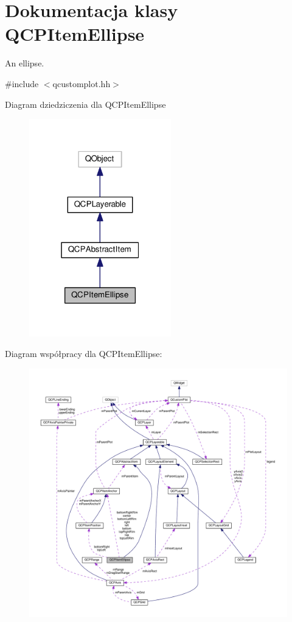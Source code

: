 \hypertarget{class_q_c_p_item_ellipse}{}\section{Dokumentacja klasy Q\+C\+P\+Item\+Ellipse}
\label{class_q_c_p_item_ellipse}


An ellipse.  




{\ttfamily \#include $<$qcustomplot.\+hh$>$}



Diagram dziedziczenia dla Q\+C\+P\+Item\+Ellipse\nopagebreak
\begin{figure}[H]
\begin{center}
\leavevmode
\includegraphics[width=175pt]{class_q_c_p_item_ellipse__inherit__graph}
\end{center}
\end{figure}


Diagram współpracy dla Q\+C\+P\+Item\+Ellipse\+:\nopagebreak
\begin{figure}[H]
\begin{center}
\leavevmode
\includegraphics[width=350pt]{class_q_c_p_item_ellipse__coll__graph}
\end{center}
\end{figure}
